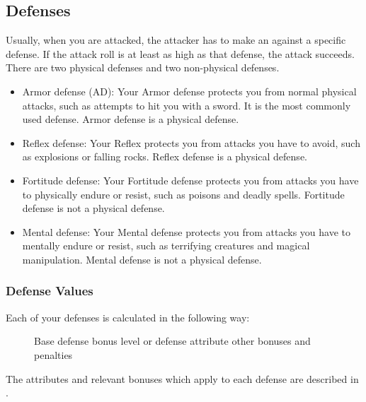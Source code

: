     \subsection{Defenses}\label{Defenses}
        Usually, when you are attacked, the attacker has to make an  against a specific defense.
        If the attack roll is at least as high as that defense, the attack succeeds.
        There are two physical defenses and two non-physical defenses.
        \begin{itemize}
            \item Armor defense (AD): Your Armor defense protects you from normal physical attacks, such as attempts to hit you with a sword.
                It is the most commonly used defense.
                Armor defense is a physical defense.
            \item Reflex defense: Your Reflex protects you from attacks you have to avoid, such as explosions or falling rocks.
                Reflex defense is a physical defense.
            \item Fortitude defense: Your Fortitude defense protects you from attacks you have to physically endure or resist, such as poisons and deadly spells.
                Fortitude defense is not a physical defense.
            \item Mental defense: Your Mental defense protects you from attacks you have to mentally endure or resist, such as terrifying creatures and magical manipulation.
                Mental defense is not a physical defense.
        \end{itemize}

        \subsubsection{Defense Values}\label{Defense Values}

            Each of your defenses is calculated in the following way:

            \begin{figure}[h]
                \centering Base defense bonus \add level or defense attribute \add other bonuses and penalties
            \end{figure}

            The attributes and relevant bonuses which apply to each defense are described in .

